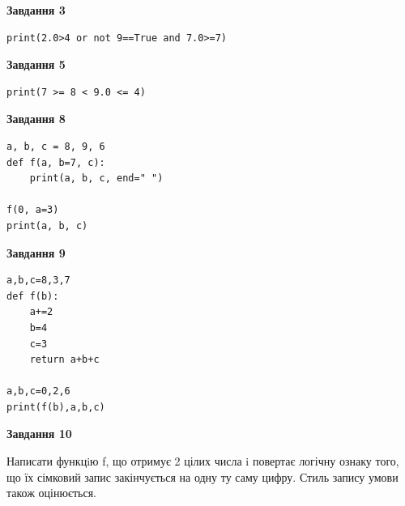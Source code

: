 \documentclass[12pt, ukrainian]{article}
\begin{document}
{\begin {large}
\begin{minipage}[t]{7.5cm}
\end{minipage}
\vline \hspace{6mm}
\begin{minipage}[t]{10.5cm}

\begin{center}
\textbf{Завдання 3}
\end{center}

\begin{verbatim}
print(2.0>4 or not 9==True and 7.0>=7)
\end{verbatim}



\begin{center}
\textbf{Завдання 5}
\end{center}

\begin{verbatim}
print(7 >= 8 < 9.0 <= 4)
\end{verbatim}



\begin{center}
\textbf{Завдання 8}
\end{center}

\begin{verbatim}
a, b, c = 8, 9, 6
def f(a, b=7, c):
    print(a, b, c, end=" ")

f(0, a=3)
print(a, b, c)
\end{verbatim}



\begin{center}
\textbf{Завдання 9}
\end{center}

\begin{verbatim}
a,b,c=8,3,7
def f(b):
    a+=2
    b=4
    c=3
    return a+b+c

a,b,c=0,2,6
print(f(b),a,b,c)
\end{verbatim}



\begin{center}
\textbf{Завдання 10}
\end{center}

Написати функцiю f, що отримує 2 цілих числа i повертає логічну ознаку того, що їх сімковий запис закінчується на одну ту саму цифру. Стиль запису умови також оцінюється.\par

\end{minipage}

\end {large}}
\newpage
\end{document}
